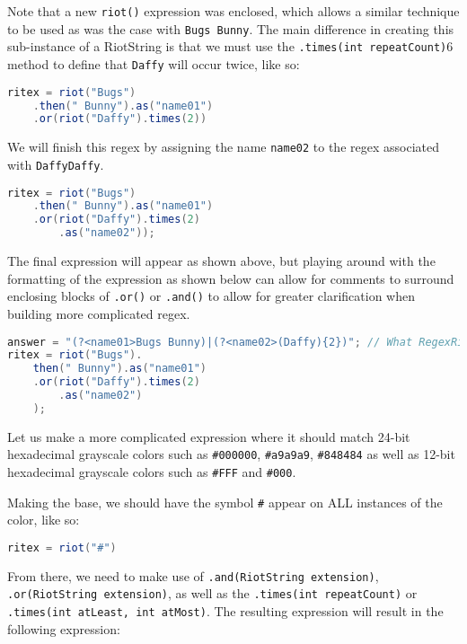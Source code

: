 \documentclass[conference]{IEEEtran}
\begin{document}
Note that a new \texttt{riot()} expression was enclosed, which allows a similar
technique to be used as was the case with \texttt{Bugs Bunny}. The main
difference in creating this sub-instance of a RiotString is that we must
use the \texttt{.times(int repeatCount)}6 method to define that \texttt{Daffy} will
occur twice, like so:

\begin{lstlisting}[language=Java]
ritex = riot("Bugs")
    .then(" Bunny").as("name01")
    .or(riot("Daffy").times(2))
\end{lstlisting}

We will finish this regex by assigning the name \texttt{name02}
to the regex associated with \texttt{DaffyDaffy}.

\begin{lstlisting}[language=Java]
ritex = riot("Bugs")
    .then(" Bunny").as("name01")
    .or(riot("Daffy").times(2)
        .as("name02"));
\end{lstlisting}

The final expression will appear as shown above, but playing around with
the formatting of the expression as shown below can allow for comments
to surround enclosing blocks of \texttt{.or()} or \texttt{.and()} to allow for
greater clarification when building more complicated regex.

\begin{lstlisting}[language=Java]
answer = "(?<name01>Bugs Bunny)|(?<name02>(Daffy){2})"; // What RegexRiot would generate
ritex = riot("Bugs").
    then(" Bunny").as("name01")
    .or(riot("Daffy").times(2)
        .as("name02")
    );
\end{lstlisting}

Let us make a more complicated expression where it should match 24-bit
hexadecimal grayscale colors such as \texttt{\#000000}, \texttt{\#a9a9a9},
\texttt{\#848484} as well as 12-bit hexadecimal grayscale colors such as
\texttt{\#FFF} and \texttt{\#000}.

Making the base, we should have the symbol \texttt{\#} appear on ALL instances
of the color, like so:

\begin{lstlisting}[language=Java]
ritex = riot("#")
\end{lstlisting}


From there, we need to make use of \texttt{.and(RiotString extension)},
\texttt{.or(RiotString extension)}, as well as the
\texttt{.times(int repeatCount)} or \texttt{.times(int atLeast, int atMost)}.
The resulting expression will result in the following expression:
\end{document}
